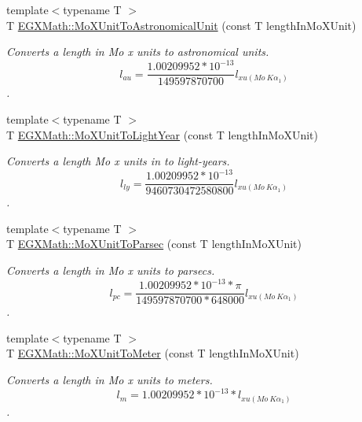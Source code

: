 \begin{DoxyCompactItemize}
\item 
{\footnotesize template$<$typename T $>$ }\\T \mbox{\hyperlink{group___e_g_x_math-_conversions-_length_conversions-_non-_s_i-_mo_x_unit-_astronomical_ga7a72c84200a6ae279a9fe7499db6e7f1}{E\+G\+X\+Math\+::\+Mo\+X\+Unit\+To\+Astronomical\+Unit}} (const T length\+In\+Mo\+X\+Unit)
\begin{DoxyCompactList}\small\item\em Converts a length in Mo x units to astronomical units. \[ l_{au}= \frac{1.00209952*10^{-13}}{149597870700} l_{xu(Mo\ K\alpha_1)} \]. \end{DoxyCompactList}\item 
{\footnotesize template$<$typename T $>$ }\\T \mbox{\hyperlink{group___e_g_x_math-_conversions-_length_conversions-_non-_s_i-_mo_x_unit-_astronomical_ga5b2db9c0d1b2663190463aaf3203a27f}{E\+G\+X\+Math\+::\+Mo\+X\+Unit\+To\+Light\+Year}} (const T length\+In\+Mo\+X\+Unit)
\begin{DoxyCompactList}\small\item\em Converts a length Mo x units in to light-\/years. \[ l_{ly}= \frac{1.00209952*10^{-13}}{9460730472580800} l_{xu(Mo\ K\alpha_1)} \]. \end{DoxyCompactList}\item 
{\footnotesize template$<$typename T $>$ }\\T \mbox{\hyperlink{group___e_g_x_math-_conversions-_length_conversions-_non-_s_i-_mo_x_unit-_astronomical_ga257eaf0a2f8f74aca2917964524d486d}{E\+G\+X\+Math\+::\+Mo\+X\+Unit\+To\+Parsec}} (const T length\+In\+Mo\+X\+Unit)
\begin{DoxyCompactList}\small\item\em Converts a length in Mo x units to parsecs. \[ l_{pc}=\frac{1.00209952*10^{-13} * \pi}{149597870700 * 648000} l_{xu(Mo\ K\alpha_1)} \]. \end{DoxyCompactList}\item 
{\footnotesize template$<$typename T $>$ }\\T \mbox{\hyperlink{group___e_g_x_math-_conversions-_length_conversions-_non-_s_i-_mo_x_unit-_s_i_gac13a59e6a52dfa24e2a39ff579ae60bb}{E\+G\+X\+Math\+::\+Mo\+X\+Unit\+To\+Meter}} (const T length\+In\+Mo\+X\+Unit)
\begin{DoxyCompactList}\small\item\em Converts a length in Mo x units to meters. \[ l_{m}=1.00209952*10^{-13} * l_{xu(Mo\ K\alpha_1)} \]. \end{DoxyCompactList}\item 

\end{DoxyCompactItemize}
